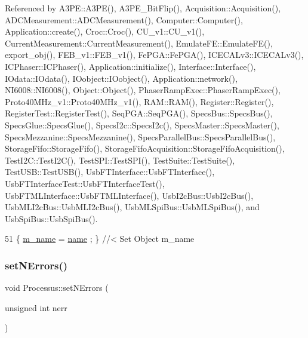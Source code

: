Referenced by A3\+P\+E\+::\+A3\+P\+E(), A3\+P\+E\+\_\+\+Bit\+Flip(), Acquisition\+::\+Acquisition(), A\+D\+C\+Measurement\+::\+A\+D\+C\+Measurement(), Computer\+::\+Computer(), Application\+::create(), Croc\+::\+Croc(), C\+U\+\_\+v1\+::\+C\+U\+\_\+v1(), Current\+Measurement\+::\+Current\+Measurement(), Emulate\+F\+E\+::\+Emulate\+F\+E(), export\+\_\+obj(), F\+E\+B\+\_\+v1\+::\+F\+E\+B\+\_\+v1(), Fe\+P\+G\+A\+::\+Fe\+P\+G\+A(), I\+C\+E\+C\+A\+Lv3\+::\+I\+C\+E\+C\+A\+Lv3(), I\+C\+Phaser\+::\+I\+C\+Phaser(), Application\+::initialize(), Interface\+::\+Interface(), I\+Odata\+::\+I\+Odata(), I\+Oobject\+::\+I\+Oobject(), Application\+::network(), N\+I6008\+::\+N\+I6008(), Object\+::\+Object(), Phaser\+Ramp\+Exec\+::\+Phaser\+Ramp\+Exec(), Proto40\+M\+Hz\+\_\+v1\+::\+Proto40\+M\+Hz\+\_\+v1(), R\+A\+M\+::\+R\+A\+M(), Register\+::\+Register(), Register\+Test\+::\+Register\+Test(), Seq\+P\+G\+A\+::\+Seq\+P\+G\+A(), Specs\+Bus\+::\+Specs\+Bus(), Specs\+Glue\+::\+Specs\+Glue(), Specs\+I2c\+::\+Specs\+I2c(), Specs\+Master\+::\+Specs\+Master(), Specs\+Mezzanine\+::\+Specs\+Mezzanine(), Specs\+Parallel\+Bus\+::\+Specs\+Parallel\+Bus(), Storage\+Fifo\+::\+Storage\+Fifo(), Storage\+Fifo\+Acquisition\+::\+Storage\+Fifo\+Acquisition(), Test\+I2\+C\+::\+Test\+I2\+C(), Test\+S\+P\+I\+::\+Test\+S\+P\+I(), Test\+Suite\+::\+Test\+Suite(), Test\+U\+S\+B\+::\+Test\+U\+S\+B(), Usb\+F\+T\+Interface\+::\+Usb\+F\+T\+Interface(), Usb\+F\+T\+Interface\+Test\+::\+Usb\+F\+T\+Interface\+Test(), Usb\+F\+T\+M\+L\+Interface\+::\+Usb\+F\+T\+M\+L\+Interface(), Usb\+I2c\+Bus\+::\+Usb\+I2c\+Bus(), Usb\+M\+L\+I2c\+Bus\+::\+Usb\+M\+L\+I2c\+Bus(), Usb\+M\+L\+Spi\+Bus\+::\+Usb\+M\+L\+Spi\+Bus(), and Usb\+Spi\+Bus\+::\+Usb\+Spi\+Bus().


\begin{DoxyCode}
51 \{ \hyperlink{classObject_a8b83c95c705d2c3ba0d081fe1710f48d}{m\_name}  = \hyperlink{classObject_a300f4c05dd468c7bb8b3c968868443c1}{name}  ; \} \textcolor{comment}{//< Set Object m\_name}
\end{DoxyCode}
\mbox{\label{classProcessus_a831b027b9cf18ab56fa6147b5d3055da}} 
\subsubsection{\texorpdfstring{set\+N\+Errors()}{setNErrors()}}
{\footnotesize\ttfamily void Processus\+::set\+N\+Errors (\begin{DoxyParamCaption}\item[{unsigned int}]{nerr }\end{DoxyParamCaption})\hspace{0.3cm}{\ttfamily [inherited]}}

